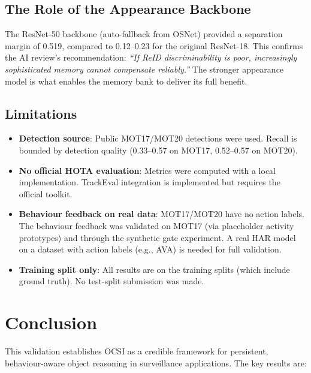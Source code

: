 \documentclass[11pt,a4paper]{article}
\begin{document}
\subsection{The Role of the Appearance Backbone}
The ResNet-50 backbone (auto-fallback from OSNet) provided a separation margin of 0.519, compared to 0.12--0.23 for the original ResNet-18. This confirms the AI review's recommendation: \emph{``If ReID discriminability is poor, increasingly sophisticated memory cannot compensate reliably.''} The stronger appearance model is what enables the memory bank to deliver its full benefit.

\subsection{Limitations}
\begin{itemize}[leftmargin=2em]
    \item \textbf{Detection source}: Public MOT17/MOT20 detections were used. Recall is bounded by detection quality (0.33--0.57 on MOT17, 0.52--0.57 on MOT20).
    \item \textbf{No official HOTA evaluation}: Metrics were computed with a local implementation. TrackEval integration is implemented but requires the official toolkit.
    \item \textbf{Behaviour feedback on real data}: MOT17/MOT20 have no action labels. The behaviour feedback was validated on MOT17 (via placeholder activity prototypes) and through the synthetic gate experiment. A real HAR model on a dataset with action labels (e.g., AVA) is needed for full validation.
    \item \textbf{Training split only}: All results are on the training splits (which include ground truth). No test-split submission was made.
\end{itemize}

\section{Conclusion}

This validation establishes OCSI as a credible framework for persistent, behaviour-aware object reasoning in surveillance applications. The key results are:
\end{document}
